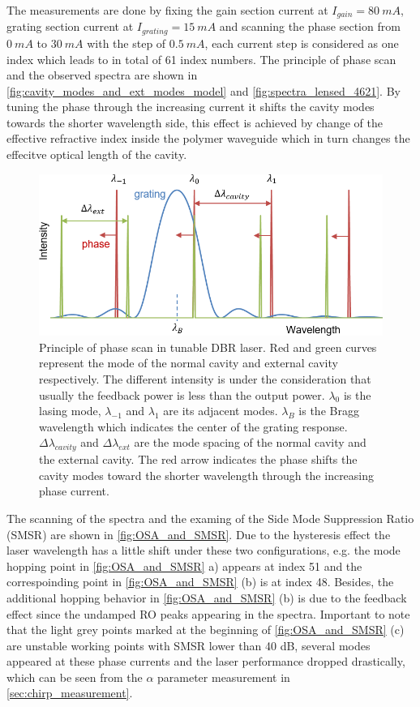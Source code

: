 The measurements are done by fixing the gain section current at $I_{gain}=80 \ mA$, grating section current at $I_{grating}=15 \ mA$ and scanning the phase section from $0 \ mA$ to $30 \ mA$ with the step of $0.5 \ mA$, each current step is considered as one index which leads to in total of 61 index numbers. The principle of phase scan and the observed spectra are shown in \autoref{fig:cavity_modes_and_ext_modes_model} and \autoref{fig:spectra_lensed_4621}. By tuning the phase through the increasing current it shifts the cavity modes towards the shorter wavelength side, this effect is achieved by change of the effective refractive index inside the polymer waveguide which in turn changes the effecitve optical length of the cavity. 

\begin{figure}[ht]
    \centering
    \includegraphics[width=.7\linewidth]{figures/cavity_modes_and_ext_modes_model.png}
    \caption{Principle of phase scan in tunable DBR laser. Red and green curves represent the mode of the normal cavity and external cavity respectively. The different intensity is under the consideration that usually the feedback power is less than the output power. $\lambda_0$ is the lasing mode, $\lambda_{-1}$ and $\lambda_{1}$ are its adjacent modes. $\lambda_B$ is the Bragg wavelength which indicates the center of the grating response. $\Delta\lambda_{cavity}$ and $\Delta\lambda_{ext}$ are the mode spacing of the normal cavity and the external cavity. The red arrow indicates the phase shifts the cavity modes toward the shorter wavelength through the increasing phase current. }
    \label{fig:cavity_modes_and_ext_modes_model}
\end{figure}

The scanning of the spectra and the examing of the Side Mode Suppression Ratio (SMSR) are shown in \autoref{fig:OSA_and_SMSR}. Due to the hysteresis effect the laser wavelength has a little shift under these two configurations, e.g. the mode hopping point in \autoref{fig:OSA_and_SMSR} a) appears at index 51 and the correspoinding point in \autoref{fig:OSA_and_SMSR} (b) is at index 48. Besides, the additional hopping behavior in \autoref{fig:OSA_and_SMSR} (b) is due to the feedback effect since the undamped RO peaks appearing in the spectra. Important to note that the light grey points marked at the beginning of \autoref{fig:OSA_and_SMSR} (c) are unstable working points with SMSR lower than 40 dB, several modes appeared at these phase currents and the laser performance dropped drastically, which can be seen from the $\alpha$ parameter measurement in \autoref{sec:chirp_measurement}.

